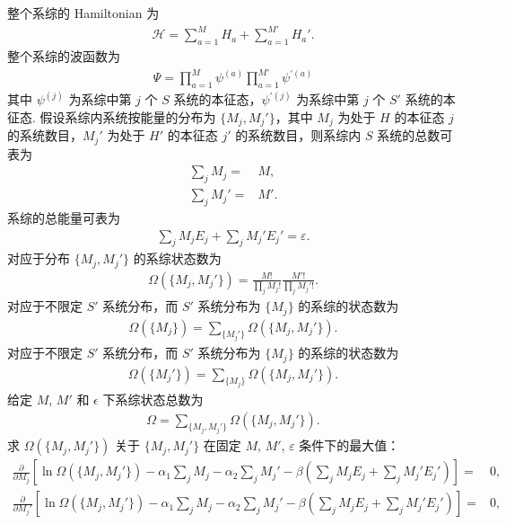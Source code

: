 \documentclass{assignment}
\begin{document}
\begin{pf}
    整个系综的 Hamiltonian 为
    \begin{align}
        \mathcal{H}=\sum_{a=1}^MH_a+\sum_{a=1}^{M'}H_a'.
    \end{align}
    整个系综的波函数为
    \begin{align}
        \Psi=\prod_{a=1}^M\psi^{(a)}\prod_{a=1}^{M'}\psi^{'(a)}
    \end{align}
    其中 $\psi^{(j)}$ 为系综中第 $j$ 个 $S$ 系统的本征态，$\psi^{'(j)}$ 为系综中第 $j$ 个 $S'$ 系统的本征态.
    假设系综内系统按能量的分布为 $\{M_j,M_j'\}$，其中 $M_j$ 为处于 $H$ 的本征态 $j$ 的系统数目，$M_j'$ 为处于 $H'$ 的本征态 $j'$ 的系统数目，则系综内 $S$ 系统的总数可表为
    \begin{align}
        \sum_jM_j=&M,\\
        \sum_jM_j'=&M'.
    \end{align}
    系综的总能量可表为
    \begin{align}
        \sum_jM_jE_j+\sum_jM_j'E_j'=\varepsilon.
    \end{align}
    对应于分布 $\{M_j,M_j'\}$ 的系综状态数为
    \begin{align}
        \Omega(\{M_j,M_j'\})=\frac{M!}{\prod_jM_j!}\frac{M'!}{\prod_jM_j'!}.
    \end{align}
    对应于不限定 $S'$ 系统分布，而 $S'$ 系统分布为 $\{M_j\}$ 的系综的状态数为
    \begin{align}
        \Omega(\{M_j\})=\sum_{\{M_j'\}}\Omega(\{M_j,M_j'\}).
    \end{align}
    对应于不限定 $S'$ 系统分布，而 $S'$ 系统分布为 $\{M_j\}$ 的系综的状态数为
    \begin{align}
        \Omega(\{M_j'\})=\sum_{\{M_j\}}\Omega(\{M_j,M_j'\}).
    \end{align}
    给定 $M$, $M'$ 和 $\epsilon$ 下系综状态总数为
    \begin{align}
        \Omega=\sum_{\{M_j,M_j'\}}\Omega(\{M_j,M_j'\}).
    \end{align}
    求 $\Omega(\{M_j,M_j'\})$ 关于 $\{M_j,M_j'\}$ 在固定 $M$, $M'$, $\varepsilon$ 条件下的最大值：
    \begin{align}
        \label{2-parital/partialMj}
        \frac{\partial}{\partial M_j}\left[\ln\Omega(\{M_j,M_j'\})-\alpha_1\sum_jM_j-\alpha_2\sum_jM_j'-\beta\left(\sum_jM_jE_j+\sum_jM_j'E_j'\right)\right]=&0,\\
        \label{2-partial/partialMj'}
        \frac{\partial}{\partial M_j'}\left[\ln\Omega(\{M_j,M_j'\})-\alpha_1\sum_jM_j-\alpha_2\sum_jM_j'-\beta\left(\sum_jM_jE_j+\sum_jM_j'E_j'\right)\right]=&0,

\end{align}
\end{pf}
\end{document}
